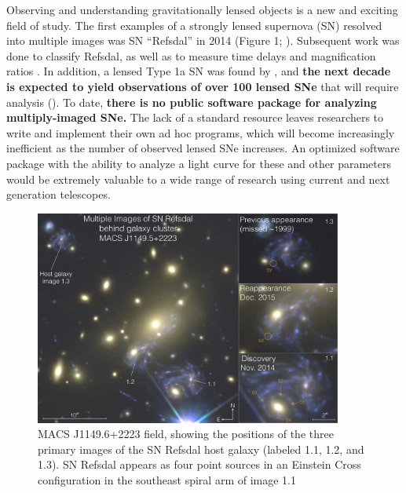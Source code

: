 \thispagestyle{fancy}
\lhead{}
\rhead{}
\renewcommand{\headrulewidth}{1pt}
\renewcommand{\footrulewidth}{0pt}
\newcommand{\packageName}{\textit{SNTD}}
\renewcommand{\baselinestretch}{1.5} 

\fancyfoot[C]{}

\pagestyle{fancy}
Observing and understanding gravitationally lensed objects is a new
and exciting field of study. The first examples of a strongly lensed
supernova (SN) resolved into multiple images was SN ``Refsdal'' in
2014 (Figure 1; \citet{Kelly:2015a}). Subsequent work was done to
classify Refsdal, as well as to measure time delays and magnification
ratios \citep{Kelly:2016,Rodney:2016}. In addition, a lensed Type 1a SN was found
by \cite{Goobar:2016}, and \textbf{the next decade is expected to yield observations
of over 100 lensed SNe} that will require analysis (\cite{Oguri:2010}).
To date, \textbf{there is no public software package for analyzing multiply-imaged SNe.}
The lack of a standard resource leaves researchers to write and implement their 
own ad hoc programs, which will become increasingly inefficient as the number of
observed lensed SNe increases. 
An optimized software package with the ability to analyze a light curve for 
these and other parameters would be extremely valuable to a wide range of
 research using current and next generation telescopes.

\begin{figure}[h]
\centering
\includegraphics[width=0.9\textwidth]{refsdal_rodney.pdf}
\caption{
MACS J1149.6+2223 field, showing the positions of the three primary
images of the SN Refsdal host galaxy (labeled 1.1, 1.2, and 1.3). SN
Refsdal appears as four point sources in an Einstein Cross
configuration in the southeast spiral arm of image 1.1 \cite{Rodney:2016}}
\end{figure}


